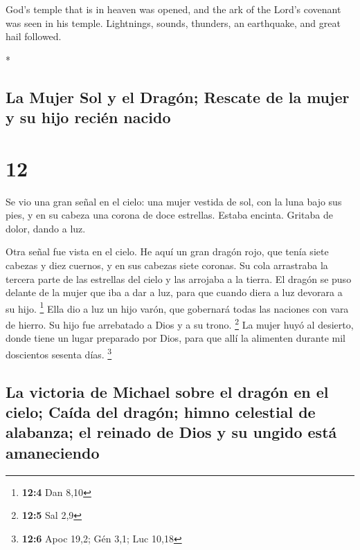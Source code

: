 \begin{paracol}{2}
\begin{otherlanguage}{english}
 God's temple that is in heaven was opened, and the ark
of the Lord's covenant was seen in his temple. Lightnings, sounds,
thunders, an earthquake, and great hail followed.

\end{otherlanguage}

\switchcolumn[0]*

\hypertarget{la-mujer-sol-y-el-draguxf3n-rescate-de-la-mujer-y-su-hijo-reciuxe9n-nacido}{%
\subsection{La Mujer Sol y el Dragón; Rescate de la mujer y su hijo
recién
nacido}\label{la-mujer-sol-y-el-draguxf3n-rescate-de-la-mujer-y-su-hijo-reciuxe9n-nacido}}

\hypertarget{section-22}{%
\section{12}\label{section-22}}

 Se vio una gran señal en el cielo: una mujer vestida de
sol, con la luna bajo sus pies, y en su cabeza una corona de doce
estrellas.  Estaba encinta. Gritaba de dolor, dando a luz.

 Otra señal fue vista en el cielo. He aquí un gran dragón
rojo, que tenía siete cabezas y diez cuernos, y en sus cabezas siete
coronas.  Su cola arrastraba la tercera parte de las
estrellas del cielo y las arrojaba a la tierra. El dragón se puso
delante de la mujer que iba a dar a luz, para que cuando diera a luz
devorara a su hijo. \footnote{\textbf{12:4} Dan 8,10} 
Ella dio a luz un hijo varón, que gobernará todas las naciones con vara
de hierro. Su hijo fue arrebatado a Dios y a su trono. \footnote{\textbf{12:5}
  Sal 2,9}  La mujer huyó al desierto, donde tiene un
lugar preparado por Dios, para que allí la alimenten durante mil
doscientos sesenta días. \footnote{\textbf{12:6} Apoc 19,2; Gén 3,1; Luc
  10,18}

\hypertarget{la-victoria-de-michael-sobre-el-draguxf3n-en-el-cielo-cauxedda-del-draguxf3n-himno-celestial-de-alabanza-el-reinado-de-dios-y-su-ungido-estuxe1-amaneciendo}{%
\subsection{La victoria de Michael sobre el dragón en el cielo; Caída
del dragón; himno celestial de alabanza; el reinado de Dios y su ungido
está
amaneciendo}\label{la-victoria-de-michael-sobre-el-draguxf3n-en-el-cielo-cauxedda-del-draguxf3n-himno-celestial-de-alabanza-el-reinado-de-dios-y-su-ungido-estuxe1-amaneciendo}}


\end{paracol}

